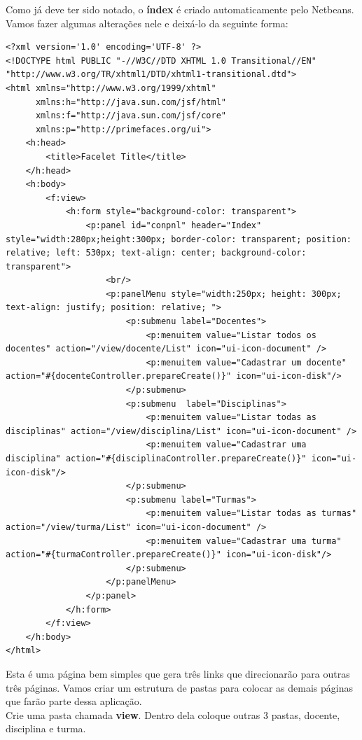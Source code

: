 \documentclass[12pt,a4paper]{article}
\begin{document}
Como já deve ter sido notado, o \textbf{índex} é criado automaticamente pelo Netbeans. Vamos fazer algumas alterações nele e deixá-lo da seguinte forma:

\lstset{language=HTML}
\begin{lstlisting}
<?xml version='1.0' encoding='UTF-8' ?>
<!DOCTYPE html PUBLIC "-//W3C//DTD XHTML 1.0 Transitional//EN" "http://www.w3.org/TR/xhtml1/DTD/xhtml1-transitional.dtd">
<html xmlns="http://www.w3.org/1999/xhtml"
      xmlns:h="http://java.sun.com/jsf/html"
      xmlns:f="http://java.sun.com/jsf/core"
      xmlns:p="http://primefaces.org/ui">
    <h:head>
        <title>Facelet Title</title>
    </h:head>
    <h:body>
        <f:view>
            <h:form style="background-color: transparent">
                <p:panel id="conpnl" header="Index"  style="width:280px;height:300px; border-color: transparent; position: relative; left: 530px; text-align: center; background-color: transparent">
                    <br/>
                    <p:panelMenu style="width:250px; height: 300px; text-align: justify; position: relative; ">
                        <p:submenu label="Docentes">
                            <p:menuitem value="Listar todos os docentes" action="/view/docente/List" icon="ui-icon-document" />
                            <p:menuitem value="Cadastrar um docente" action="#{docenteController.prepareCreate()}" icon="ui-icon-disk"/>
                        </p:submenu>
                        <p:submenu  label="Disciplinas">
                            <p:menuitem value="Listar todas as disciplinas" action="/view/disciplina/List" icon="ui-icon-document" />
                            <p:menuitem value="Cadastrar uma disciplina" action="#{disciplinaController.prepareCreate()}" icon="ui-icon-disk"/>
                        </p:submenu>
                        <p:submenu label="Turmas">
                            <p:menuitem value="Listar todas as turmas" action="/view/turma/List" icon="ui-icon-document" />
                            <p:menuitem value="Cadastrar uma turma" action="#{turmaController.prepareCreate()}" icon="ui-icon-disk"/>
                        </p:submenu>
                    </p:panelMenu>
                </p:panel>
            </h:form>
        </f:view>
    </h:body>
</html>
\end{lstlisting}

Esta é uma página bem simples que gera três links que direcionarão para outras três páginas. Vamos criar um estrutura de pastas para colocar as demais páginas que farão parte dessa aplicação.\\
Crie uma pasta chamada \textbf{view}. Dentro dela coloque outras 3 pastas, docente, disciplina e turma. 
\end{document}
